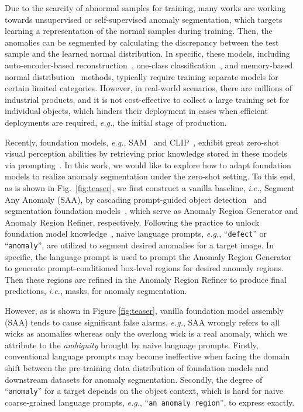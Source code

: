 \documentclass{article}
\begin{document}
Due to the scarcity of abnormal samples for training, many works are working towards unsupervised or self-supervised anomaly segmentation, which targets learning a representation of the normal samples during training. Then, the anomalies can be segmented by calculating the discrepancy between the test sample and the learned normal distribution. In specific, these models, including auto-encoder-based reconstruction~\cite{zhou2020encoding,hou2021divide,zavrtanik2021draem,matsubara2020deep,yan2021learning,jiang2022masked}, one-class classification~\cite{yi2020patch,massoli2021mocca,sohn2020learning}, and memory-based normal distribution~\cite{roth2022towards, wan_industrial_2022, cao2023complementary, wang_multimodal_nodate, jiang_softpatch_2022} methods, typically require training separate models for certain limited categories. However, in real-world scenarios, there are millions of industrial products, and it is not cost-effective to collect a large training set for individual objects, which hinders their deployment in cases when efficient deployments are required, \textit{e.g.}, the initial stage of production.

Recently, foundation models, \textit{e.g.}, SAM~\cite{kirillov2023segment} and CLIP~\cite{radford2021learning}, exhibit great zero-shot visual perception abilities by retrieving prior knowledge stored in these models via prompting~\cite{li2022align, bommasani2021opportunities}.  In this work, we would like to explore how to adapt foundation models to realize anomaly segmentation under the zero-shot setting. To this end, as is shown in Fig.~\ref{fig:teaser}, we first construct a vanilla baseline, \textit{i.e.}, Segment Any Anomaly (SAA), by cascading prompt-guided object detection~\cite{liu2023grounding} and segmentation foundation models~\cite{kirillov2023segment}, which serve as Anomaly Region Generator and Anomaly Region Refiner, respectively. Following the practice to unlock foundation model knowledge~\cite{clipseg2022,jeong2023winclip}, naive language prompts, \textit{e.g.}, ``\verb|defect|'' or ``\verb|anomaly|'', are utilized to segment desired anomalies for a target image. In specific, the language prompt is used to prompt the Anomaly Region Generator to generate prompt-conditioned box-level regions for desired anomaly regions. Then these regions are refined in the Anomaly Region Refiner to produce final predictions, \textit{i.e.}, masks, for anomaly segmentation. 


However, as is shown in Figure \ref{fig:teaser}, vanilla foundation model assembly (SAA) tends to cause significant false alarms, \textit{e.g.}, SAA wrongly refers to all wicks as anomalies whereas only the overlong wick is a real anomaly, which we attribute to the \textit{ambiguity} brought by naive language prompts. Firstly, conventional language prompts may become ineffective when facing the domain shift between the pre-training data distribution of foundation models and downstream datasets for anomaly segmentation. Secondly, the degree of ``\verb|anomaly|'' for a target depends on the object context, which is hard for naive coarse-grained language prompts, \textit{e.g.}, ``\verb|an anomaly region|'', to express exactly.
\end{document}
